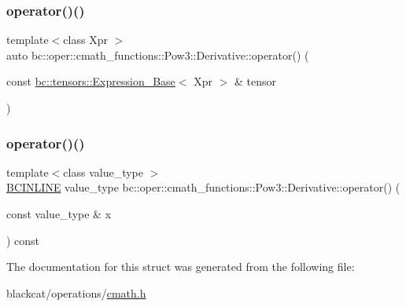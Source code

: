 \mbox{\label{structbc_1_1oper_1_1cmath__functions_1_1Pow3_1_1Derivative_a80b154cd4453de7540bfa11ef7b46a75}} 
\subsubsection{\texorpdfstring{operator()()}{operator()()}\hspace{0.1cm}{\footnotesize\ttfamily [2/3]}}
{\footnotesize\ttfamily template$<$class Xpr $>$ \\
auto bc\+::oper\+::cmath\+\_\+functions\+::\+Pow3\+::\+Derivative\+::operator() (\begin{DoxyParamCaption}\item[{const \hyperlink{classbc_1_1tensors_1_1Expression__Base}{bc\+::tensors\+::\+Expression\+\_\+\+Base}$<$ Xpr $>$ \&}]{tensor }\end{DoxyParamCaption})\hspace{0.3cm}{\ttfamily [inline]}}

\mbox{\label{structbc_1_1oper_1_1cmath__functions_1_1Pow3_1_1Derivative_a63a4cfd6c32048239ec22205f97ab7b4}} 
\subsubsection{\texorpdfstring{operator()()}{operator()()}\hspace{0.1cm}{\footnotesize\ttfamily [3/3]}}
{\footnotesize\ttfamily template$<$class value\+\_\+type $>$ \\
\hyperlink{common_8h_a6699e8b0449da5c0fafb878e59c1d4b1}{B\+C\+I\+N\+L\+I\+NE} value\+\_\+type bc\+::oper\+::cmath\+\_\+functions\+::\+Pow3\+::\+Derivative\+::operator() (\begin{DoxyParamCaption}\item[{const value\+\_\+type \&}]{x }\end{DoxyParamCaption}) const\hspace{0.3cm}{\ttfamily [inline]}}



The documentation for this struct was generated from the following file\+:\begin{DoxyCompactItemize}
\item 
blackcat/operations/\hyperlink{cmath_8h}{cmath.\+h}\end{DoxyCompactItemize}
